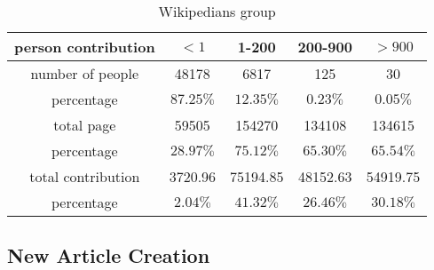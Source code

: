 \documentclass{elsarticle}
\begin{document}
\begin{table}[h]
  \centering
  \caption{Wikipedians group}
  \begin{tabular}[center]{|c|c|c|c|c|}
    \hline
     person contribution& $< 1$&1-200&200-900&$>900$ \\\hline
    number of people&48178&6817&125&30 \\\hline
    percentage&$87.25\%$&$12.35\%$&$0.23\%$&$0.05\%$ \\\hline
    total page&59505&154270&134108&134615 \\\hline
    percentage&$28.97\%$&$75.12\%$&$65.30\%$&$65.54\%$ \\\hline
    total contribution&3720.96&75194.85&48152.63&54919.75 \\\hline
    percentage&$2.04\%$&$41.32\%$&$26.46\%$&$30.18\%$ \\\hline 
  \end{tabular}

\end{table}

\subsection{New Article Creation}
\label{sec:new-article-creation}


\end{document}
